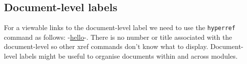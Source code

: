 \subsection*{Document-level labels}
For a viewable links to the document-level label we need to use the \texttt{hyperref} command as follows: -\hyperref[book:cameltest]{hello}-. There is no number or title associated with the document-level so other xref commands don't know what to display. Document-level labels might be useful to organise documents within and across modules.

\endinput

